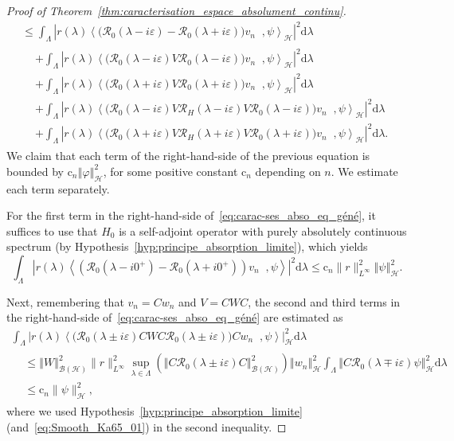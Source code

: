 \documentclass[10pt]{amsart}
\theoremstyle{definition}\newtheorem{defi}[theo]{Definition}\newtheorem{rema}[theo]{Remark}\newtheorem{exam}[theo]{Example}\newtheorem{exem}[theo]{Example}\newtheorem{nota}[theo]{Notation}
\newcommand{\Hi}{\mathcal{H}}
\newcommand{\rmc}{\mathrm{c}}
\newcommand{\rmd}{\mathrm{d}}
\newcommand{\norme}[1]{\left\Vert #1\right\Vert}
\newcommand{\scal}[2]{\left\langle{#1} \middle., {#2}\right\rangle}
\newcommand{\abso}[1]{\left|{#1}\right|}
\newcommand{\Res}{\mathcal{R}}
\newcommand{\clB}{\mathcal{B}}
\begin{document}
\begin{proof}[Proof of Theorem~\ref{thm:caracterisation_espace_absolument_continu}]
\begin{multline}
\leq\int_{\Lambda}\abso{r(\lambda)\scal{\big(\Res_0(\lambda-i\varepsilon)-\Res_0(\lambda+i\varepsilon)\big)v_n}{\psi}_\Hi}^2\rmd \lambda\\
\begin{aligned}
&+\int_{\Lambda}\abso{r(\lambda)\scal{\big(\Res_0(\lambda-i\varepsilon)V\Res_0(\lambda-i\varepsilon)\big)v_n}{\psi}_\Hi}^2\rmd \lambda\\
&+\int_{\Lambda}\abso{r(\lambda)\scal{\big(\Res_0(\lambda+i\varepsilon)V\Res_0(\lambda+i\varepsilon)\big)v_n}{\psi}_\Hi}^2\rmd \lambda\\
&+\int_{\Lambda}\abso{r(\lambda)\scal{\big(\Res_0(\lambda-i\varepsilon)V\Res_H(\lambda-i\varepsilon)V\Res_0(\lambda-i\varepsilon)\big)v_n}{\psi}_\Hi}^2\rmd \lambda\\
&+\int_{\Lambda}\abso{r(\lambda)\scal{\big(\Res_0(\lambda+i\varepsilon)V\Res_H(\lambda+i\varepsilon)V\Res_0(\lambda+i\varepsilon)\big)v_n}{\psi}_\Hi}^2\rmd \lambda.
\end{aligned}
\end{multline}
We claim that each term of the right-hand-side of the previous equation is bounded by $\rmc_n\norme{\varphi}_\Hi^2$, for some positive constant $\rmc_n$ depending on $n$. We estimate each term separately.

For the first term in the right-hand-side of~\eqref{eq:carac-ses_abso_eq_géné}, it suffices to use that $H_0$ is a self-adjoint operator with purely absolutely continuous spectrum (by Hypothesis~\ref{hyp:principe_absorption_limite}), which yields
\begin{equation}\label{eq:carac_ses_abso_H_0}
\int_{\Lambda}\abso{r(\lambda)\scal{\left(\Res_0\left(\lambda-i0^+\right)-\Res_0\left(\lambda+i0^+\right)\right)v_n}{\psi}}^2\rmd \lambda\leq \rmc_n\|r\|^2_{L^\infty}\norme{\psi}_\Hi^2.
\end{equation}

Next, remembering that $v_n=Cw_n$ and $V=CWC$, the second and third terms in the right-hand-side of~\eqref{eq:carac-ses_abso_eq_géné} are estimated as
\begin{multline}\label{eq:t2}
\int_{\Lambda}\abso{r(\lambda)\scal{\big(\Res_0(\lambda\pm i\varepsilon)CWC\Res_0(\lambda\pm i\varepsilon)\big)Cw_n}{\psi}}_\Hi^2\rmd \lambda \\
\begin{aligned}
&\leq\norme{W}_{\clB(\Hi)}^2\|r\|_{L^\infty}^2\sup_{\lambda\in\Lambda}\left(\norme{C\Res_0(\lambda\pm i\varepsilon)C}_{\clB(\Hi)}^2\right)\norme{w_n}^2_{\Hi}\int_{\Lambda}\norme{C\Res_0(\lambda\mp i\varepsilon)\psi}^2_\Hi\rmd \lambda \\
&\leq \rmc_n\|\psi\|^2_\Hi, 
\end{aligned}
\end{multline}
where we used Hypothesis~\ref{hyp:principe_absorption_limite} (and~\eqref{eq:Smooth_Ka65_01}) in the second inequality.


\end{proof}
\end{document}
